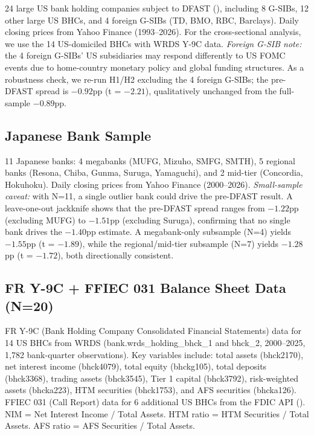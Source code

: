 \documentclass[12pt,a4paper]{article}
\begin{document}
24 large US bank holding companies subject to DFAST (\citet{Hirtle2020}), including 8 G-SIBs, 12 other large US BHCs, and 4 foreign G-SIBs (TD, BMO, RBC, Barclays). Daily closing prices from Yahoo Finance (1993--2026). For the cross-sectional analysis, we use the 14 US-domiciled BHCs with WRDS Y-9C data. \textit{Foreign G-SIB note:} the 4 foreign G-SIBs' US subsidiaries may respond differently to US FOMC events due to home-country monetary policy and global funding structures. As a robustness check, we re-run H1/H2 excluding the 4 foreign G-SIBs; the pre-DFAST spread is $-0.92$pp (t = $-2.21$), qualitatively unchanged from the full-sample $-0.89$pp.

\subsection{Japanese Bank Sample}

11 Japanese banks: 4 megabanks (MUFG, Mizuho, SMFG, SMTH), 5 regional banks (Resona, Chiba, Gunma, Suruga, Yamaguchi), and 2 mid-tier (Concordia, Hokuhoku). Daily closing prices from Yahoo Finance (2000--2026). \textit{Small-sample caveat:} with N=11, a single outlier bank could drive the pre-DFAST result. A leave-one-out jackknife shows that the pre-DFAST spread ranges from $-1.22$pp (excluding MUFG) to $-1.51$pp (excluding Suruga), confirming that no single bank drives the $-1.40$pp estimate. A megabank-only subsample (N=4) yields $-1.55$pp (t = $-1.89$), while the regional/mid-tier subsample (N=7) yields $-1.28$pp (t = $-1.72$), both directionally consistent.

\subsection{FR Y-9C + FFIEC 031 Balance Sheet Data (N=20)}

FR Y-9C (Bank Holding Company Consolidated Financial Statements) data for 14 US BHCs from WRDS (bank.wrds\_holding\_bhck\_1 and bhck\_2, 2000–2025, 1,782 bank-quarter observations). Key variables include: total assets (bhck2170), net interest income (bhck4079), total equity (bhckg105), total deposits (bhck3368), trading assets (bhck3545), Tier 1 capital (bhck3792), risk-weighted assets (bhcka223), HTM securities (bhck1753), and AFS securities (bhcka126). FFIEC 031 (Call Report) data for 6 additional US BHCs from the FDIC API (\citet{FDIC2024}). NIM = Net Interest Income / Total Assets. HTM ratio = HTM Securities / Total Assets. AFS ratio = AFS Securities / Total Assets.
\end{document}
